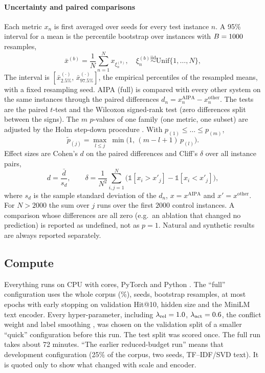 \paragraph{Uncertainty and paired comparisons}
Each metric $x_n$ is first averaged over seeds for every test instance $n$. A 95\% interval for a mean is the percentile bootstrap over instances with $B=1000$ resamples,
\begin{equation}
  \label{eq:boot}
  \bar{x}^{(b)}=\frac{1}{N}\sum_{n=1}^{N}x_{\xi^{(b)}_n},\quad \xi^{(b)}_n\overset{\text{iid}}{\sim}\mathrm{Unif}\{1,\dots,N\},
\end{equation}
The interval is $[\bar{x}^{(\cdot)}_{2.5\%},\,\bar{x}^{(\cdot)}_{97.5\%}]$, the empirical percentiles of the resampled means, with a fixed resampling seed. AIPA (full) is compared with every other system on the same instances through the paired differences $d_n=x_n^{\mathrm{AIPA}}-x_n^{\mathrm{other}}$. The tests are the paired $t$-test and the Wilcoxon signed-rank test (zero differences split between the signs). The $m$ $p$-values of one family (one metric, one subset) are adjusted by the Holm step-down procedure \cite{holm1979simple}. With $p_{(1)}\le\dots\le p_{(m)}$,
\begin{equation}
  \label{eq:holm}
  \tilde{p}_{(j)}=\max_{l\le j}\ \min\big(1,\,(m-l+1)\,p_{(l)}\big).
\end{equation}
Effect sizes are Cohen's $d$ on the paired differences and Cliff's $\delta$ \cite{cliff1993dominance} over all instance pairs,
\begin{equation}
  \label{eq:effects}
  d=\frac{\bar{d}}{s_d},\qquad
  \delta=\frac{1}{N^2}\sum_{i,j=1}^{N}\big(\mathbb{1}[x_i>x'_j]-\mathbb{1}[x_i<x'_j]\big),
\end{equation}
where $s_d$ is the sample standard deviation of the $d_n$, $x=x^{\mathrm{AIPA}}$ and $x'=x^{\mathrm{other}}$. For $N>2000$ the sum over $j$ runs over the first $2000$ control instances. A comparison whose differences are all zero (e.g.\ an ablation that changed no prediction) is reported as undefined, not as $p=1$. Natural and synthetic results are always reported separately.


\subsection{Compute}
Everything runs on CPU with \cpuCount{} cores, PyTorch \torchVersion{} and Python \pythonVersion. The ``full'' configuration uses the whole corpus (\subsetPct\%), \nSeeds{} seeds, \nBoot{} bootstrap resamples, at most \nEpochs{} epochs with early stopping on validation Hit@10, hidden size \hiddenDim{} and the MiniLM text encoder. Every hyper-parameter, including $\lambda_{\mathrm{rel}}=1.0$, $\lambda_{\mathrm{act}}=0.6$, the conflict weight \conflictLossWeight{} and label smoothing \relLabelSmoothing, was chosen on the validation split of a smaller ``quick'' configuration before this run. The test split was scored once. The full run takes about 72 minutes. ``The earlier reduced-budget run'' means that development configuration (25\% of the corpus, two seeds, TF--IDF/SVD text). It is quoted only to show what changed with scale and encoder.

